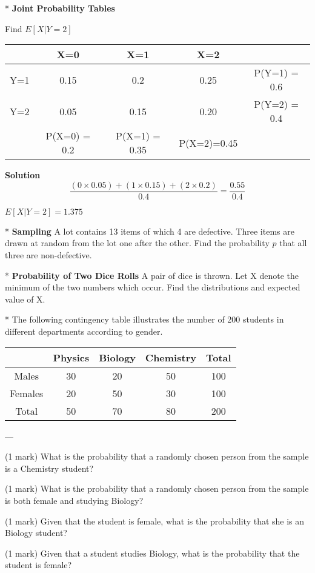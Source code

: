 

* \textbf{Joint Probability Tables}

Find $E[X|Y=2]$

\begin{tabular}{ccccc}
& X=0  & X=1  & X=2  &              \\ \hline
Y=1 & 0.15 & 0.2  & 0.25 & P(Y=1) = 0.6 \\ \hline
Y=2 & 0.05 & 0.15 & 0.20 & P(Y=2) = 0.4 \\ \hline
& P(X=0) = 0.2  & P(X=1) = 0.35  & P(X=2)=0.45  &              \\ \hline
\end{tabular}


\begin{framed}
\textbf{Solution}
\[   \frac{(0 \times 0.05) + (1 \times 0.15)+(2 \times 0.2) }{0.4}  = \frac{0.55}{0.4}  \] 

$E[X|Y=2] = 1.375$
\end{framed}


* \textbf{Sampling}
A lot contains 13 items of which 4 are defective. Three items are drawn at random from the lot one after the other. Find the probability $p$ that all three are non-defective.



* \textbf{Probability of Two Dice Rolls}
A pair of dice is thrown. Let X denote the minimum of the two numbers which occur.
Find the distributions and expected value of X.

* The following contingency table illustrates the number of 200 students in different
departments according to gender.

\begin{center}
\begin{tabular}{|c|c|c|c|c|}
\hline
& Physics & Biology & Chemistry & Total \\\hline
Males & 30 & 20 & 50 & 100 \\  \hline
Females & 20 & 50 & 30 & 100 \\ \hline
Total & 50 & 70 & 80 & 200 \\
\hline
\end{tabular}
\end{center}

--- 
\item[a.] (1 mark) What is the probability that a randomly chosen person from the sample is a
Chemistry student?
\item[b.] (1 mark) What is the probability that a randomly chosen person from the sample is both female and studying Biology?
\item[c.] (1 mark) Given that the student is female, what is the probability that she is an
Biology student?
\item[d.] (1 mark) Given that a student studies Biology, what is the probability that the student is female?

